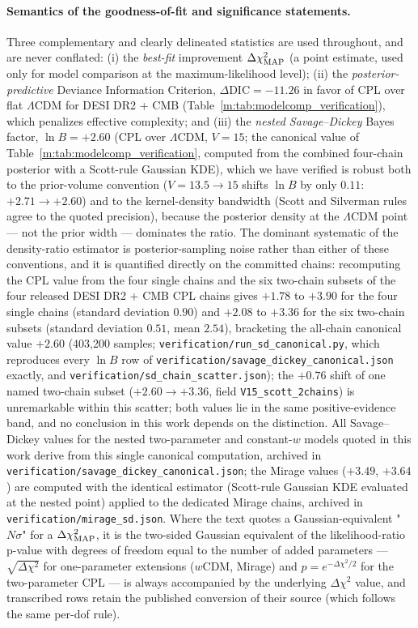 \documentclass[aps,prd,preprint,superscriptaddress,nofootinbib]{revtex4-2}
\begin{document}
\paragraph{Semantics of the goodness-of-fit and significance statements.} Three complementary and clearly delineated statistics are used throughout, and are never conflated: (i) the \emph{best-fit} improvement $\Delta\chi^2_{\rm MAP}$ (a point estimate, used only for model comparison at the maximum-likelihood level); (ii) the \emph{posterior-predictive} Deviance Information Criterion, $\Delta\mathrm{DIC} = -11.26$ in favor of CPL over flat $\Lambda$CDM for DESI DR2 + CMB (Table~\ref{m:tab:modelcomp_verification}), which penalizes effective complexity; and (iii) the \emph{nested Savage--Dickey} Bayes factor, $\ln B = +2.60$ (CPL over $\Lambda$CDM, $V = 15$; the canonical value of Table~\ref{m:tab:modelcomp_verification}, computed from the combined four-chain posterior with a Scott-rule Gaussian KDE), which we have verified is robust both to the prior-volume convention ($V = 13.5 \to 15$ shifts $\ln B$ by only $0.11$: $+2.71 \to +2.60$) and to the kernel-density bandwidth (Scott and Silverman rules agree to the quoted precision), because the posterior density at the $\Lambda$CDM point --- not the prior width --- dominates the ratio. The dominant systematic of the density-ratio estimator is posterior-sampling noise rather than either of these conventions, and it is quantified directly on the committed chains: recomputing the CPL value from the four single chains and the six two-chain subsets of the four released DESI DR2 + CMB CPL chains gives $+1.78$ to $+3.90$ for the four single chains (standard deviation $0.90$) and $+2.08$ to $+3.36$ for the six two-chain subsets (standard deviation $0.51$, mean $2.54$), bracketing the all-chain canonical value $+2.60$ (403{,}200 samples; \texttt{verification/run\_sd\_canonical.py}, which reproduces every $\ln B$ row of \texttt{verification/savage\_dickey\_canonical.json} exactly, and \texttt{verification/sd\_chain\_scatter.json}); the $+0.76$ shift of one named two-chain subset ($+2.60 \to +3.36$, field \texttt{V15\_scott\_2chains}) is unremarkable within this scatter; both values lie in the same positive-evidence band, and no conclusion in this work depends on the distinction. All Savage--Dickey values for the nested two-parameter and constant-$w$ models quoted in this work derive from this single canonical computation, archived in \texttt{verification/savage\_dickey\_canonical.json}; the Mirage values ($+3.49$, $+3.64$) are computed with the identical estimator (Scott-rule Gaussian KDE evaluated at the nested point) applied to the dedicated Mirage chains, archived in \texttt{verification/mirage\_sd.json}. Where the text quotes a Gaussian-equivalent "$N\sigma$" for a $\Delta\chi^2_{\rm MAP}$, it is the two-sided Gaussian equivalent of the likelihood-ratio p-value with degrees of freedom equal to the number of added parameters --- $\sqrt{\Delta\chi^2}$ for one-parameter extensions ($w$CDM, Mirage) and $p = e^{-\Delta\chi^2/2}$ for the two-parameter CPL --- is always accompanied by the underlying $\Delta\chi^2$ value, and transcribed rows retain the published conversion of their source (which follows the same per-dof rule).
\end{document}

